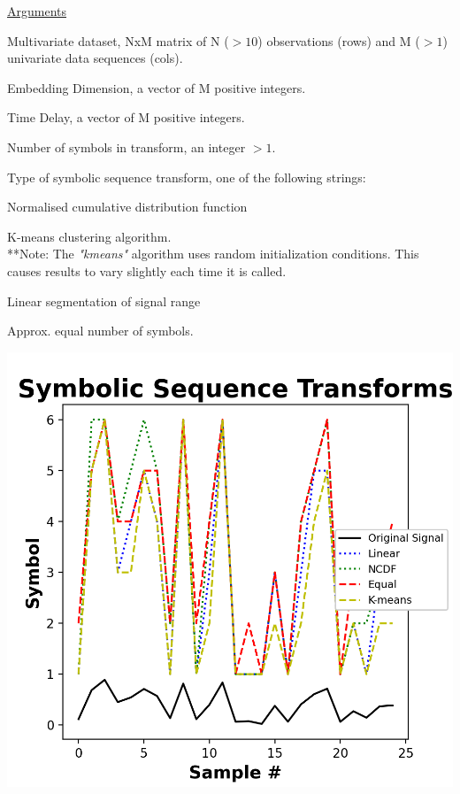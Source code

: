 \documentclass[12pt, a4paper, titlepage, openany]{book}
\begin{document}
\noindent \ul{Arguments}
\begin{description}[labelsep=1cm, labelwidth=2cm, nosep,,style=multiline,leftmargin=3cm]\footnotesize
\item[\texttt{Data}]	Multivariate dataset, NxM matrix of N ($>10$) observations (rows) and M ($> 1$) univariate data sequences (cols).
\item[\texttt{m}]		Embedding Dimension, a vector of M positive integers.
\item[\texttt{tau}]		Time Delay, a vector of M positive integers. 
\item[\texttt{c}]		Number of symbols in transform, an integer $> 1$. 
\item[\texttt{Typex}]	Type of symbolic sequence transform, one of the following strings:
	\begin{description}[labelsep=5em, labelwidth=8em, nosep,style=multiline,leftmargin=3cm]
		\item[\texttt{"ncdf"}]		Normalised cumulative distribution function  \cite{Disp1}		
		\item[\texttt{"kmeans"}] 	K-means clustering algorithm.\\
		**Note: The \textit{"kmeans"} algorithm uses random initialization conditions.
		 This causes results to vary slightly each time it is called.
		\item[\texttt{"linear"}]	Linear segmentation of signal range 
		\item[\texttt{"equal"}]		Approx. equal number of symbols.
		\item[]		\includegraphics[scale=.75]{Disp1.png}

\end{description}
\end{description}
\end{document}
